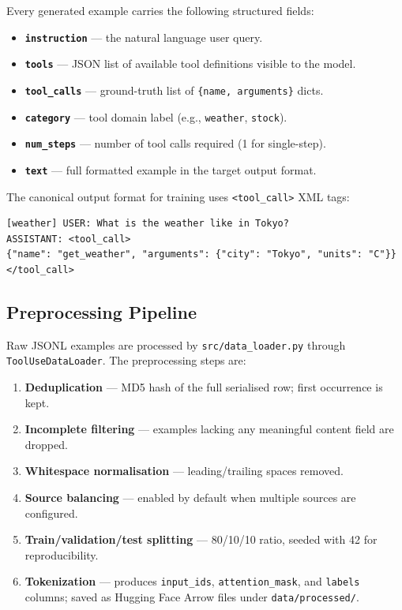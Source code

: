 \documentclass[12pt, a4paper]{article}
\begin{document}
Every generated example carries the following structured fields:

\begin{itemize}[leftmargin=1.5em, itemsep=3pt]
  \item \textbf{\texttt{instruction}} --- the natural language user query.
  \item \textbf{\texttt{tools}} --- JSON list of available tool definitions visible to the model.
  \item \textbf{\texttt{tool\_calls}} --- ground-truth list of \texttt{\{name, arguments\}} dicts.
  \item \textbf{\texttt{category}} --- tool domain label (e.g., \texttt{weather}, \texttt{stock}).
  \item \textbf{\texttt{num\_steps}} --- number of tool calls required (1 for single-step).
  \item \textbf{\texttt{text}} --- full formatted example in the target output format.
\end{itemize}

The canonical output format for training uses \texttt{<tool\_call>} XML tags:

\begin{lstlisting}
[weather] USER: What is the weather like in Tokyo?
ASSISTANT: <tool_call>
{"name": "get_weather", "arguments": {"city": "Tokyo", "units": "C"}}
</tool_call>
\end{lstlisting}

\subsection{Preprocessing Pipeline}

Raw JSONL examples are processed by \texttt{src/data\_loader.py} through
\texttt{ToolUseDataLoader}. The preprocessing steps are:

\begin{enumerate}[leftmargin=1.5em, itemsep=5pt]
  \item \textbf{Deduplication} --- MD5 hash of the full serialised row;
    first occurrence is kept.
  \item \textbf{Incomplete filtering} --- examples lacking any meaningful
    content field are dropped.
  \item \textbf{Whitespace normalisation} --- leading/trailing spaces removed.
  \item \textbf{Source balancing} --- enabled by default when multiple sources
    are configured.
  \item \textbf{Train/validation/test splitting} --- 80/10/10 ratio, seeded
    with 42 for reproducibility.
  \item \textbf{Tokenization} --- produces \texttt{input\_ids},
    \texttt{attention\_mask}, and \texttt{labels} columns; saved as
    Hugging Face Arrow files under \texttt{data/processed/}.
\end{enumerate}
\end{document}
